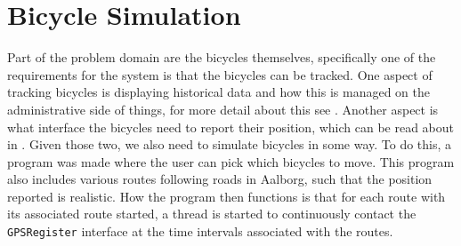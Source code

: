 \section{Bicycle Simulation}
Part of the problem domain are the bicycles themselves, specifically one of the requirements for the system is that the bicycles can be tracked.
One aspect of tracking bicycles is displaying historical data and how this is managed on the administrative side of things, for more detail about this see .
Another aspect is what interface the bicycles need to report their position, which can be read about in . 
Given those two, we also need to simulate bicycles in some way.
To do this, a program was made where the user can pick which bicycles to move. 
This program also includes various routes following roads in Aalborg, such that the position reported is realistic.
How the program then functions is that for each route with its associated route started, a thread is started to continuously contact the \texttt{GPSRegister} interface at the time intervals associated with the routes.
